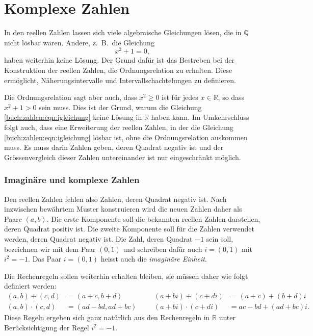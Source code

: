 %
%
%
\section{Komplexe Zahlen
\label{buch:section:komplexe-zahlen}}
In den reellen Zahlen lassen sich viele algebraische Gleichungen lösen,
die in $\mathbb{Q}$ nicht lösbar waren.
Andere, z.~B.~die Gleichung
\begin{equation}
x^2+1=0,
\label{buch:zahlen:eqn:igleichung}
\end{equation}
haben weiterhin keine Lösung.
Der Grund dafür ist das Bestreben bei der Konstruktion der reellen Zahlen, 
die Ordnungsrelation zu erhalten.
%
Diese ermöglicht, Näherungsintervalle und Intervallschachtelungen
zu definieren.

Die Ordnungsrelation sagt aber auch, dass $x^2\ge 0$ ist für jedes
$x\in\mathbb{R}$, so dass $x^2+1>0$ sein muss.
Dies ist der Grund, warum die Gleichung \ref{buch:zahlen:eqn:igleichung}
keine Lösung in $\mathbb{R}$ haben kann.
Im Umkehrschluss folgt auch, dass eine Erweiterung der reellen Zahlen,
in der die Gleichung \eqref{buch:zahlen:eqn:igleichung} lösbar ist,
ohne die Ordnungsrelation auskommen muss.
Es muss darin Zahlen geben, deren Quadrat negativ ist und der
Grössenvergleich dieser Zahlen untereinander ist nur eingeschränkt
möglich.


\subsubsection{Imaginäre und komplexe Zahlen}
Den reellen Zahlen fehlen also Zahlen, deren Quadrat negativ ist.
Nach inzwischen bewährtem Muster konstruieren wird die neuen Zahlen
daher als Paare $(a,b)$.
Die erste Komponente soll die bekannten reellen Zahlen darstellen,
deren Quadrat positiv ist.
Die zweite Komponente soll für die Zahlen verwendet werden, deren Quadrat
negativ ist.
Die Zahl, deren Quadrat $-1$ sein soll, bezeichnen wir mit dem
Paar $(0,1)$ und schreiben dafür auch $i=(0,1)$ mit $i^2=-1$.
Das Paar $i=(0,1)$ heisst auch die {\em imaginäre Einheit}.
%

Die Rechenregeln sollen weiterhin erhalten bleiben, sie müssen daher
wie folgt definiert werden:
\begin{equation}
\begin{aligned}
(a,b) + (c,d) &= (a+c,b+d) &&& (a+bi) + (c+di) &= (a+c) + (b+d)i
\\
(a,b) \cdot (c,d) &= (ad-bd, ad+bc) &&& (a+bi)\cdot(c+di) &= ac-bd + (ad+bc)i.
\end{aligned}
\label{buch:zahlen:cregeln}
\end{equation}
Diese Regeln ergeben sich ganz natürlich aus den Rechenregeln
in $\mathbb{R}$ unter Berücksichtigung der Regel $i^2=-1$.

